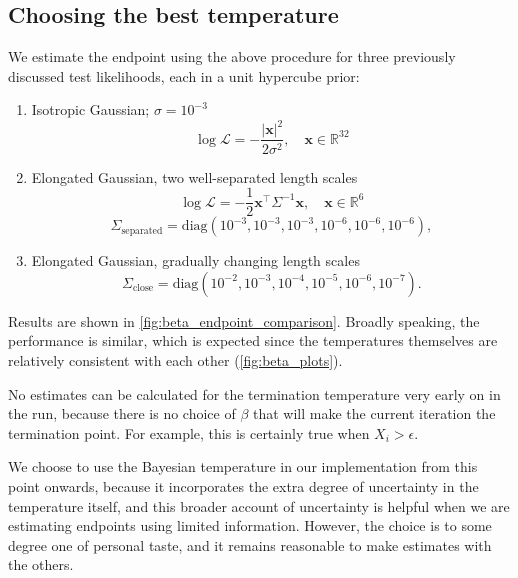 \documentclass[usenatbib]{mnras}
\newcommand{\Like}{\mathcal{L}}
\begin{document}
\subsection{Choosing the best temperature}\label{sec:choosing_the_best_temperature}
We estimate the endpoint using the above procedure for three previously discussed test likelihoods, each in a unit hypercube prior:
\begin{enumerate}[leftmargin=*]
    \item Isotropic Gaussian; $\sigma = 10^{-3}$
        \begin{equation}
        \log \Like = -\frac{|\bm{x}|^2}{2\sigma^2}, \quad \bm{x} \in \mathbb{R}^{32}
        \end{equation}
    \item Elongated Gaussian, two well-separated length scales 
        \begin{equation}
            \log\Like = -\frac{1}{2} \bm{x}^\intercal \Sigma^{-1}\bm{x}, \quad \bm{x} \in \mathbb{R}^6
        \end{equation}
        \begin{equation*}
            \Sigma_\mathrm{separated} = \mathrm{diag}(10^{-3}, 10^{-3}, 10^{-3}, 10^{-6}, 10^{-6}, 10^{-6}),
        \end{equation*}
    \item Elongated Gaussian, gradually changing length scales
        \begin{equation}
            \Sigma_\mathrm{close} = \mathrm{diag}(10^{-2}, 10^{-3}, 10^{-4}, 10^{-5}, 10^{-6}, 10^{-7}).
        \end{equation}
\end{enumerate}
Results are shown in \cref{fig:beta_endpoint_comparison}. Broadly speaking, the performance is similar, which is expected since the temperatures themselves are relatively consistent with each other (\cref{fig:beta_plots}).
\par
No estimates can be calculated for the termination temperature very early on in the run, because there is no choice of $\beta$ that will make the current iteration the termination point. For example, this is certainly true when $X_i > \epsilon$.
\par
We choose to use the Bayesian temperature in our implementation from this point onwards, because it incorporates the extra degree of uncertainty in the temperature itself, and this broader account of uncertainty is helpful when we are estimating endpoints using limited information. However, the choice is to some degree one of personal taste, and it remains reasonable to make estimates with the others.
\end{document}
